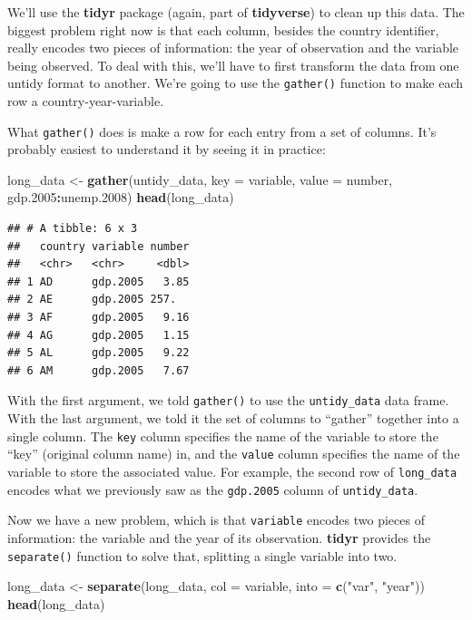 \documentclass[12pt,oneside,openany]{book}
\newenvironment{Shaded}{\begin{snugshade}}{\end{snugshade}}
\newcommand{\KeywordTok}[1]{\textcolor[rgb]{0.13,0.29,0.53}{\textbf{#1}}}
\newcommand{\DataTypeTok}[1]{\textcolor[rgb]{0.13,0.29,0.53}{#1}}
\newcommand{\FloatTok}[1]{\textcolor[rgb]{0.00,0.00,0.81}{#1}}
\newcommand{\StringTok}[1]{\textcolor[rgb]{0.31,0.60,0.02}{#1}}
\newcommand{\OperatorTok}[1]{\textcolor[rgb]{0.81,0.36,0.00}{\textbf{#1}}}
\newcommand{\NormalTok}[1]{#1}
\begin{document}
We'll use the \textbf{tidyr} package (again, part of \textbf{tidyverse})
to clean up this data. The biggest problem right now is that each
column, besides the country identifier, really encodes two pieces of
information: the year of observation and the variable being observed. To
deal with this, we'll have to first transform the data from one untidy
format to another. We're going to use the \texttt{gather()} function to
make each row a country-year-variable.

What \texttt{gather()} does is make a row for each entry from a set of
columns. It's probably easiest to understand it by seeing it in
practice:

\begin{Shaded}
\begin{Highlighting}[]
\NormalTok{long_data <-}\StringTok{ }\KeywordTok{gather}\NormalTok{(untidy_data,}
                    \DataTypeTok{key =}\NormalTok{ variable,}
                    \DataTypeTok{value =}\NormalTok{ number,}
\NormalTok{                    gdp}\FloatTok{.2005}\OperatorTok{:}\NormalTok{unemp}\FloatTok{.2008}\NormalTok{)}
\KeywordTok{head}\NormalTok{(long_data)}
\end{Highlighting}
\end{Shaded}

\begin{verbatim}
## # A tibble: 6 x 3
##   country variable number
##   <chr>   <chr>     <dbl>
## 1 AD      gdp.2005   3.85
## 2 AE      gdp.2005 257.  
## 3 AF      gdp.2005   9.16
## 4 AG      gdp.2005   1.15
## 5 AL      gdp.2005   9.22
## 6 AM      gdp.2005   7.67
\end{verbatim}

With the first argument, we told \texttt{gather()} to use the
\texttt{untidy\_data} data frame. With the last argument, we told it the
set of columns to ``gather'' together into a single column. The
\texttt{key} column specifies the name of the variable to store the
``key'' (original column name) in, and the \texttt{value} column
specifies the name of the variable to store the associated value. For
example, the second row of \texttt{long\_data} encodes what we
previously saw as the \texttt{gdp.2005} column of \texttt{untidy\_data}.

Now we have a new problem, which is that \texttt{variable} encodes two
pieces of information: the variable and the year of its observation.
\textbf{tidyr} provides the \texttt{separate()} function to solve that,
splitting a single variable into two.

\begin{Shaded}
\begin{Highlighting}[]
\NormalTok{long_data <-}\StringTok{ }\KeywordTok{separate}\NormalTok{(long_data,}
                      \DataTypeTok{col =}\NormalTok{ variable,}
                      \DataTypeTok{into =} \KeywordTok{c}\NormalTok{(}\StringTok{"var"}\NormalTok{, }\StringTok{"year"}\NormalTok{))}
\KeywordTok{head}\NormalTok{(long_data)}
\end{Highlighting}
\end{Shaded}
\end{document}
